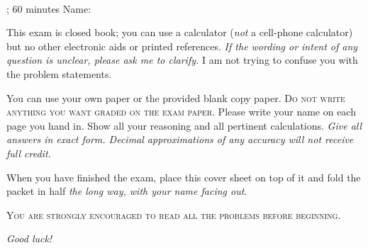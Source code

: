 \documentclass[11pt]{exam}
\begin{document}
\noindent
\textbf{{\large \courseID \\ \assignmentID}}

\noindent
\dateID; 60 minutes  \hfill Name: \underline{\hspace{3in}} 

\addpoints

\noindent
This exam is closed book; you can use a calculator (\emph{not} a cell-phone calculator) but no other electronic aids or printed references. \emph{If the wording or intent of any question is unclear, please ask me to clarify.} I am not trying to confuse you with the problem statements.

You can use your own paper or the provided blank copy paper. \textsc{Do not write anything you want graded on the exam paper.} Please write your name on each page you hand in. Show all your reasoning and all pertinent calculations. \emph{Give all answers in exact form. Decimal approximations of any accuracy will not receive full credit.}

When you have finished the exam, place this cover sheet on top of it and fold the packet in half \emph{the long way, with your name facing out}.


\begin{center}
\textsc{You are strongly encouraged to read all the problems before beginning.}
\end{center}



\begin{center}
    \gradetable
\end{center}


\begin{center}
    {\Large \emph{Good luck!}}
\end{center}

\newpage
\end{document}
